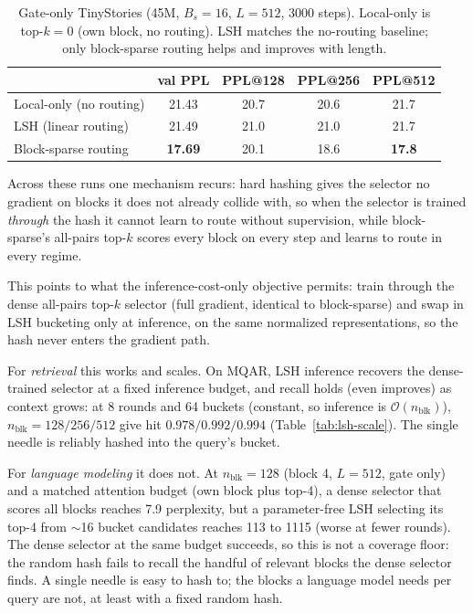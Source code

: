 \documentclass[10pt,letterpaper]{article}
\newcommand{\Ocomplex}{\mathcal{O}}
\begin{document}
\begin{table}[h]
\centering
\caption{Gate-only TinyStories (45M, $B_s{=}16$, $L{=}512$, 3000 steps).
Local-only is top-$k{=}0$ (own block, no routing). LSH matches the no-routing
baseline; only block-sparse routing helps and improves with length.}
\label{tab:lsh-lm}
\small
\begin{tabular}{lcccc}
\toprule
 & val PPL & PPL@128 & PPL@256 & PPL@512 \\
\midrule
Local-only (no routing) & 21.43 & 20.7 & 20.6 & 21.7 \\
LSH (linear routing) & 21.49 & 21.0 & 21.0 & 21.7 \\
Block-sparse routing & \textbf{17.69} & 20.1 & 18.6 & \textbf{17.8} \\
\bottomrule
\end{tabular}
\end{table}

Across these runs one mechanism recurs: hard hashing gives the selector no
gradient on blocks it does not already collide with, so when the selector is
trained \emph{through} the hash it cannot learn to route without supervision,
while block-sparse's all-pairs top-$k$ scores every block on every step and
learns to route in every regime.

This points to what the inference-cost-only objective permits: train through the
dense all-pairs top-$k$ selector (full gradient, identical to block-sparse) and
swap in LSH bucketing only at inference, on the same normalized representations,
so the hash never enters the gradient path.

For \emph{retrieval} this works and scales. On MQAR, LSH inference recovers the
dense-trained selector at a fixed inference budget, and recall holds (even
improves) as context grows: at 8 rounds and 64 buckets (constant, so inference is
$\Ocomplex(n_{\text{blk}})$), $n_{\text{blk}}{=}128/256/512$ give hit
$0.978/0.992/0.994$ (Table~\ref{tab:lsh-scale}). The single needle is reliably
hashed into the query's bucket.

For \emph{language modeling} it does not. At $n_{\text{blk}}{=}128$ (block 4,
$L{=}512$, gate only) and a matched attention budget (own block plus top-4), a
dense selector that scores all blocks reaches 7.9 perplexity, but a parameter-free
LSH selecting its top-4 from $\sim$16 bucket candidates reaches 113 to 1115 (worse
at fewer rounds). The dense selector at the same budget succeeds, so this is not a
coverage floor: the random hash fails to recall the handful of relevant blocks the
dense selector finds. A single needle is easy to hash to; the blocks a language
model needs per query are not, at least with a fixed random hash.
\end{document}
